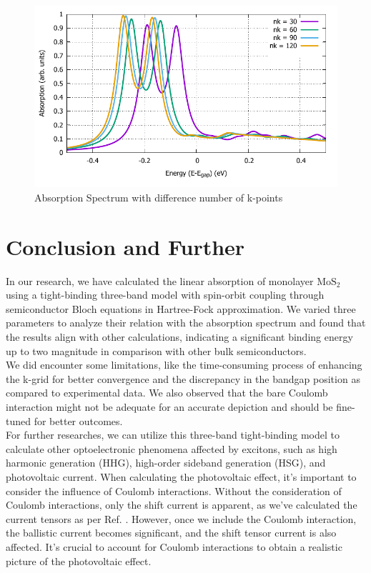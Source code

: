 \documentclass[12pt,english,a4paper]{article}
\begin{document}
\begin{figure}
	\begin{center}
		\includegraphics[width=0.75\linewidth]{images/varynk.pdf}
		\caption[Absorption Spectrum with difference number of k-points]{Absorption Spectrum with difference number of k-points}
		\label{Vary nk}
	\end{center}
\end{figure}\null
\newpage
\section{Conclusion and Further}
\quad In our research, we have calculated the linear absorption of monolayer $\mathrm{MoS}_2$ using a tight-binding three-band model with spin-orbit coupling through semiconductor Bloch equations in Hartree-Fock approximation. We varied three parameters to analyze their relation with the absorption spectrum and found that the results align with other calculations, indicating a significant binding energy up to two magnitude in comparison with other bulk semiconductors.\\\null
\quad We did encounter some limitations, like the time-consuming process of enhancing the k-grid for better convergence and the discrepancy in the bandgap position as compared to experimental data. We also observed that the bare Coulomb interaction might not be adequate for an accurate depiction and should be fine-tuned for better outcomes.\\\null
\quad For further researches, we can utilize this three-band tight-binding model to calculate other optoelectronic phenomena affected by excitons, such as high harmonic generation (HHG), high-order sideband generation (HSG), and photovoltaic current. When calculating the photovoltaic effect, it's important to consider the influence of Coulomb interactions. Without the consideration of Coulomb interactions, only the shift current is apparent, as we've calculated the current tensors as per Ref. \cite{vo_calculation_2024}. However, once we include the Coulomb interaction, the ballistic current becomes significant, and the shift tensor current is also affected. It's crucial to account for Coulomb interactions to obtain a realistic picture of the photovoltaic effect.
\end{document}

